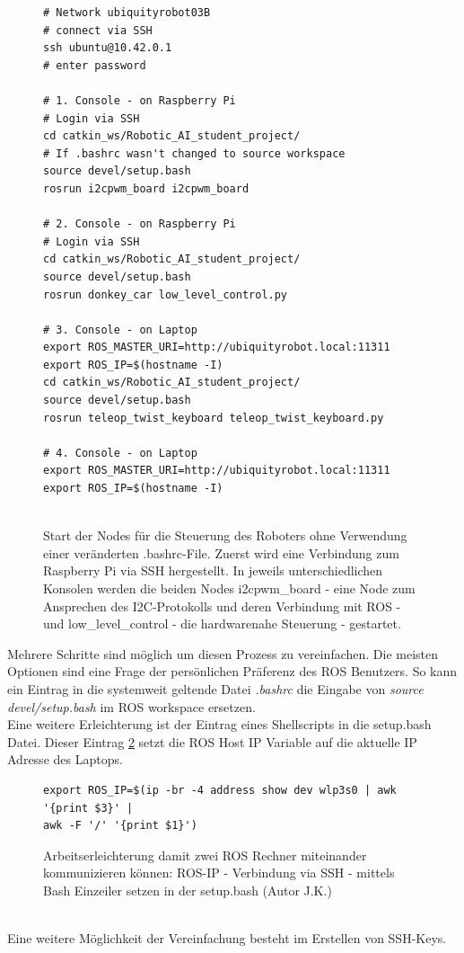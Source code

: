 \documentclass[conference]{IEEEtran}
\begin{document}
\begin{figure}
	\centering
\begin{verbatim}
# Network ubiquityrobot03B
# connect via SSH
ssh ubuntu@10.42.0.1
# enter password
	
# 1. Console - on Raspberry Pi
# Login via SSH
cd catkin_ws/Robotic_AI_student_project/
# If .bashrc wasn't changed to source workspace
source devel/setup.bash
rosrun i2cpwm_board i2cpwm_board
	
# 2. Console - on Raspberry Pi
# Login via SSH
cd catkin_ws/Robotic_AI_student_project/
source devel/setup.bash
rosrun donkey_car low_level_control.py
	
# 3. Console - on Laptop 
export ROS_MASTER_URI=http://ubiquityrobot.local:11311
export ROS_IP=$(hostname -I)
cd catkin_ws/Robotic_AI_student_project/
source devel/setup.bash
rosrun teleop_twist_keyboard teleop_twist_keyboard.py
	
# 4. Console - on Laptop
export ROS_MASTER_URI=http://ubiquityrobot.local:11311
export ROS_IP=$(hostname -I)
	
	\end{verbatim}
	\label{StartNodes}
	\caption{Start der Nodes für die Steuerung des Roboters ohne Verwendung einer veränderten 
	.bashrc-File. Zuerst wird eine Verbindung zum Raspberry Pi via SSH 
	hergestellt. In jeweils unterschiedlichen Konsolen werden die beiden 
	Nodes i2cpwm\_board - eine Node zum Ansprechen des I2C-Protokolls und 
	deren Verbindung mit ROS - und low\_level\_control - die hardwarenahe 
	Steuerung - gestartet.}
\end{figure}
	
	Mehrere Schritte sind möglich um diesen Prozess zu vereinfachen. Die 
	meisten Optionen sind eine Frage der persönlichen Präferenz des ROS 
	Benutzers. So kann ein Eintrag in die systemweit geltende Datei 
	\textit{.bashrc} die Eingabe von \textit{source devel/setup.bash} im ROS 
	workspace ersetzen. \\
	Eine weitere Erleichterung ist der Eintrag eines Shellscripts in die 
	setup.bash Datei. Dieser Eintrag \ref{Einzeiler} setzt die ROS Host IP 
	Variable auf die aktuelle IP Adresse des Laptops.
	\begin{figure}
		\centering
\begin{verbatim}
export ROS_IP=$(ip -br -4 address show dev wlp3s0 | awk '{print $3}' | 
awk -F '/' '{print $1}')
\end{verbatim}
		\label{Einzeiler}
		\caption{Arbeitserleichterung damit zwei ROS Rechner miteinander 
		kommunizieren können: ROS-IP - Verbindung via SSH - mittels Bash 
		Einzeiler setzen  in der setup.bash (Autor J.K.)}
	\end{figure}
	\\
	Eine weitere Möglichkeit der Vereinfachung besteht im Erstellen von 
	SSH-Keys. 
	
\end{document}
